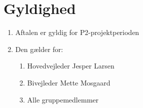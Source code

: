 \section{Gyldighed}
\begin{enumerate}
\item{Aftalen er gyldig for P2-projektperioden}
\item{Den gælder for:}
\begin{enumerate}
\item{Hovedvejleder Jesper Larsen}
\item{Bivejleder Mette Mosgaard}
\item{Alle gruppemedlemmer}
\end{enumerate}
\end{enumerate}
